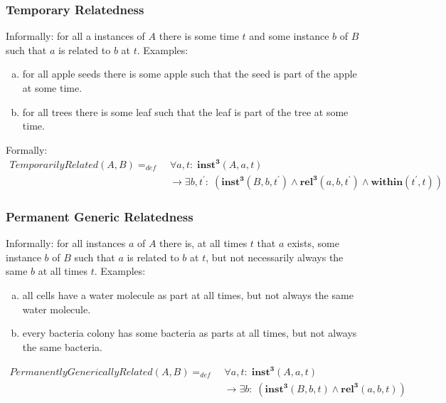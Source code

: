\documentclass[10pt]{bmc_article}
\newcommand{\mirel}[1]{\ensuremath{\mathrm{\mathbf{#1}}}}
\newcommand{\mclass}[1]{\ensuremath{\mathit{#1}}}
\newcommand{\mrel}[2]{\mirel{#1^#2}}
\newcommand{\mrelt}[1]{\mrel{#1}{3}}
\newenvironment{bmcformat}{\baselineskip20pt\sloppy\setboolean{publ}{false}}{\baselineskip20pt\sloppy}
\begin{document}
\begin{bmcformat}
\subsubsection{Temporary Relatedness}

Informally: for all a instances of \mclass{A} there is some time $t$ and some instance $b$ of
\mclass{B} such that $a$ is related to $b$ at $t$. Examples: 
\begin{enumerate}[(a)]
\item for all apple seeds there is
some apple such that the seed is part of the apple at some time. 
\item for all
trees there is some leaf such that the leaf is part of the tree at some time.
\end{enumerate}

Formally: 
\begin{equation}
\begin{split}
\mclass{TemporarilyRelated}(\mclass{A},\mclass{B}) =_{def}&\;
\forall a, t:\; \mrelt{inst}(\mclass{A}, a, t) \\
&\ \rightarrow
\exists b, t^\prime:\;(\mrelt{inst}(\mclass{B},b,t^\prime) \wedge
\mrelt{rel}(a,b,t^\prime) \wedge \mirel{within}(t^\prime,t))
\end{split}
\label{eq:temporarily}
\end{equation}

\subsubsection{Permanent Generic Relatedness}

Informally: for all instances $a$ of \mclass{A} there is, at all times $t$ that
$a$ exists,
some instance $b$ of \mclass{B} such that $a$ is related to $b$ at $t$, but not necessarily
always the same $b$ at all times $t$. Examples:
\begin{enumerate}[(a)]
\item all cells have a water molecule as
part at all times, but not always the same water molecule.
\item every bacteria colony has some bacteria as parts at all times, but not
always the same bacteria.
\end{enumerate}


\begin{equation}
\begin{split}
\mclass{PermanentlyGenericallyRelated}(\mclass{A},\mclass{B}) =_{def}&\;
\forall a, t:\; \mrelt{inst}(\mclass{A}, a, t) \\
&\ \rightarrow
\exists b:\;(\mrelt{inst}(\mclass{B},b,t) \wedge
\mrelt{rel}(a,b,t))
\end{split}
\label{eq:generically}
\end{equation}




\end{bmcformat}
\end{document}
